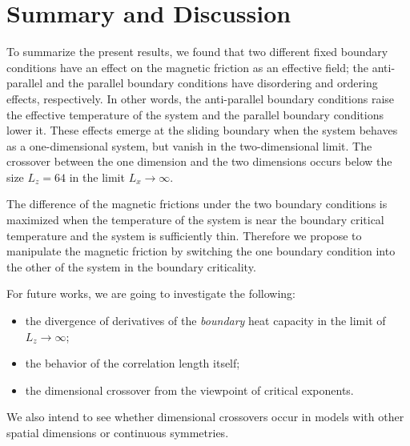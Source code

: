 \chapter{Summary and Discussion}\label{chap:Summary}

To summarize the present results, we found that two different fixed boundary conditions have an effect on the magnetic friction as an effective field; the anti-parallel and the parallel boundary conditions have disordering and ordering effects, respectively. In other words, the anti-parallel boundary conditions raise the effective temperature of the system and the parallel boundary conditions lower it. These effects emerge at the sliding boundary when the system behaves as a one-dimensional system, but vanish in the two-dimensional limit. The crossover between the one dimension and the two dimensions occurs below the size $L_{z}=64$ in the limit $L_{x}\to\infty$. 

The difference of the magnetic frictions under the two boundary conditions is maximized when the temperature of the system is near the boundary critical temperature and the system is sufficiently thin. Therefore we propose to manipulate the magnetic friction by switching the one boundary condition into the other of the system in the boundary criticality.

For future works, we are going to investigate the following:
\begin{itemize}
\item the divergence of derivatives of the \textit{boundary} heat capacity in the limit of $L_{z}\to\infty$;
\item the behavior of the correlation length itself;
\item the dimensional crossover from the viewpoint of critical exponents.
\end{itemize}
We also intend to see whether dimensional crossovers occur in models with other spatial dimensions or continuous symmetries.